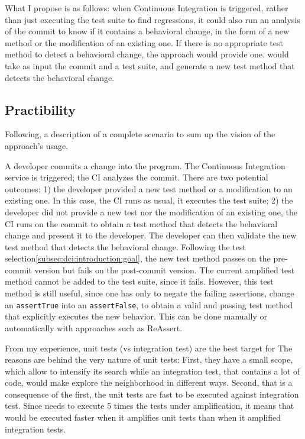 What I propose is as follows: 
when Continuous Integration is triggered, 
rather than just executing the test suite to find regressions, 
it could also run an analysis of the commit to know if it contains a behavioral change, 
in the form of a new method or the modification of an existing one.
If there is no appropriate test method to detect a behavioral change, the approach would provide one. 
\DCI would take as input the commit and a test suite, and generate a new test method that detects the behavioral change.

\subsection{Practibility}
\label{subsec:dci:background:praticability}

Following, a description of a complete scenario to sum up the vision of the approach's usage.

A developer commits a change into the program.
The Continuous Integration service is triggered;
the CI analyzes the commit.
There are two potential outcomes:
1) the developer provided a new test method or a modification to an existing one. 
In this case, the CI runs as usual, \eg it executes the test suite;
2) the developer did not provide a new test nor the modification of an existing one, the CI runs \DCI on the commit to obtain a test method that detects the behavioral change and present it to the developer.
The developer can then validate the new test method that detects the behavioral change.
Following the test selection\autoref{subsec:dci:introduction:goal}, the new test method passes on the pre-commit version but fails on the post-commit version.
The current amplified test method cannot be added to the test suite, since it fails.
However, this test method is still useful, since one has only to negate the failing assertions, \eg change an \texttt{assertTrue} into an \texttt{assertFalse}, to obtain a valid and passing test method that explicitly executes the new behavior.
This can be done manually or automatically with approaches such as ReAssert\cite{ReAssert}.

From my experience, unit tests (vs integration test) are the best target for \DCI
The reasons are behind the very nature of unit tests:
First, they have a small scope, which allow \DCI to intensify its search while an integration test, that contains a lot of code, would make \DCI explore the neighborhood in different ways.
Second, that is a consequence of the first, the unit tests are fast to be executed against integration test.
Since \DCI needs to execute 5 times the tests under amplification, it means that \DCI would be executed faster when it amplifies unit tests than when it amplified integration tests.

